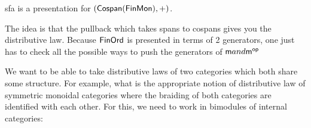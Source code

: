 \begin{lemma} \cite[?]{lack}
{\sf sfa} is a presentation for $({\sf Cospan}(\mathsf{FinMon}),+)$.
\end{lemma}

The idea is that the pullback which takes spans to cospans gives you the distributive law.  Because $\mathsf{FinOrd}$ is presented in terms of 2 generators, one just has to check all the possible ways to push the generators of ${\sf m} and {\sf m}^{\mathsf{op}}$



We want to be able to take distributive laws of two categories which both share some structure.  For example, what is the appropriate notion of distributive law of symmetric monoidal categories where the braiding of both categories are identified with each other.  For this, we need to work in bimodules of internal categories:



